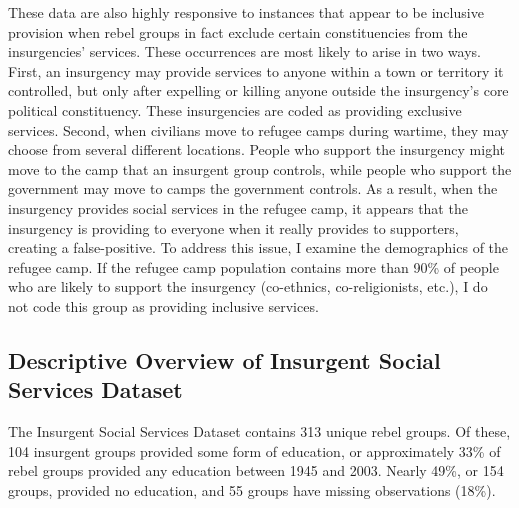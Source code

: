 \documentclass[12pt, letterpaper]{article}
\begin{document}
These data are also highly responsive to instances that appear to be inclusive provision when rebel groups in fact exclude certain constituencies from the insurgencies' services. These occurrences are most likely to arise in two ways. First, an insurgency may provide services to anyone within a town or territory it controlled, but only after expelling or killing anyone outside the insurgency's core political constituency. These insurgencies are coded as providing exclusive services. Second, when civilians move to refugee camps during wartime, they may choose from several different locations. People who support the insurgency might move to the camp that an insurgent group controls, while people who support the government may move to camps the government controls. As a result, when the insurgency provides social services in the refugee camp, it appears that the insurgency is providing to everyone when it really provides to supporters, creating a false-positive. To address this issue, I examine the demographics of the refugee camp. If the refugee camp population contains more than 90\% of people who are likely to support the insurgency (co-ethnics, co-religionists, etc.), I do not code this group as providing inclusive services. 

\subsection*{Descriptive Overview of Insurgent Social Services Dataset}

The Insurgent Social Services Dataset contains 313 unique rebel groups. Of these, 104 insurgent groups provided some form of education, or approximately 33\% of rebel groups provided any education between 1945 and 2003. Nearly 49\%, or 154 groups, provided no education, and 55 groups have missing observations (18\%). %
\end{document}
